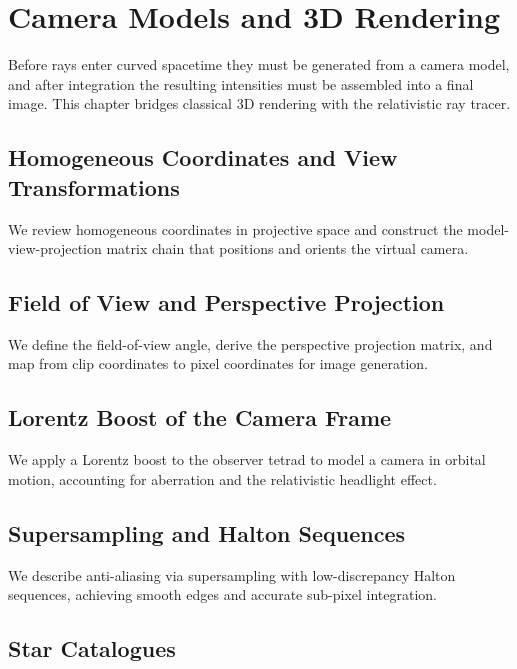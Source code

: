 \chapter{Camera Models and 3D Rendering}
\label{ch:camera-rendering}

Before rays enter curved spacetime they must be generated from a camera model,
and after integration the resulting intensities must be assembled into a final
image. This chapter bridges classical 3D rendering with the relativistic ray
tracer.

\section{Homogeneous Coordinates and View Transformations}
\label{sec:cam-homogeneous}

We review homogeneous coordinates in projective space and construct the
model-view-projection matrix chain that positions and orients the virtual
camera.

\section{Field of View and Perspective Projection}
\label{sec:cam-fov}

We define the field-of-view angle, derive the perspective projection matrix,
and map from clip coordinates to pixel coordinates for image generation.

\section{Lorentz Boost of the Camera Frame}
\label{sec:cam-lorentz}

We apply a Lorentz boost to the observer tetrad to model a camera in orbital
motion, accounting for aberration and the relativistic headlight effect.

\section{Supersampling and Halton Sequences}
\label{sec:cam-supersampling}

We describe anti-aliasing via supersampling with low-discrepancy Halton
sequences, achieving smooth edges and accurate sub-pixel integration.

\section{Star Catalogues\starmark{}}
\label{sec:cam-stars}

